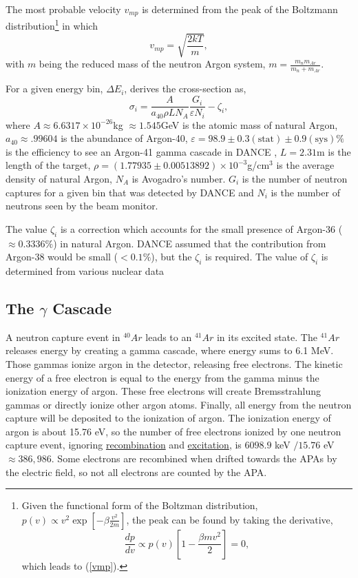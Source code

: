 \documentclass[8pt]{refart}
\begin{document}
The most probable velocity $v_{mp}$ is determined from the peak of the Boltzmann distribution\footnote{Given the functional form of the Boltzman distribution, $p(v) \propto v^2 \exp\left[-\beta \frac{v^2}{2m}\right]$, the peak can be found by taking the derivative,
\begin{equation}
\frac{dp}{dv} \propto p(v)\left[1 - \frac{\beta m v^2}{2}\right] = 0,
\end{equation}
which leads to (\ref{vmp}).} in which
\begin{equation}
    v_{mp} = \sqrt{\frac{2kT}{m}},\label{vmp}
\end{equation}
with $m$ being the reduced mass of the neutron Argon system, $m = \frac{m_n m_{Ar}}{m_n + m_{Ar}}$.

For a given energy bin, $\Delta E_i$, \cite{DANCE} derives the cross-section as,
\begin{equation}
    \sigma_i = \frac{A}{a_{40}\rho LN_A}\frac{G_i}{\varepsilon N_i} - \zeta_i,
\end{equation}
where $A \approx 6.6317\times 10^{-26}$kg $\approx 1.545$GeV is the atomic mass of natural Argon, $a_{40} \approx .99604$ is the abundance of Argon-40, $\varepsilon = 98.9 \pm 0.3(\mathrm{stat}) \pm 0.9(\mathrm{sys})\%$ is the efficiency to see an Argon-41 gamma cascade in DANCE \cite{DANCE}, $L = 2.31$m is the length of the target, $\rho = (1.77935 \pm 0.00513892)\times 10^{-3}$g/cm$^3$ is the average density of natural Argon, $N_A$ is Avogadro's number.  $G_i$ is the number of neutron captures for a given bin that was detected by DANCE \cite{DANCE} and $N_i$ is the number of neutrons seen by the beam monitor.  

The value $\zeta_i$ is a correction which accounts for the small presence of Argon-36 ($\approx 0.3336\%$) in natural Argon.  DANCE assumed that the contribution from Argon-38 would be small ($<0.1\%$), but the $\zeta_i$ is required.  The value of $\zeta_i$ is determined from various nuclear data 

\subsection{The $\gamma$ Cascade}
A neutron capture event in $^{40}Ar$ leads to an $^{41}Ar$ in its excited state. The $^{41}Ar$ releases energy by creating a gamma cascade, where energy sums to 6.1 MeV. Those gammas ionize argon in the detector, releasing free electrons. The kinetic energy of a free electron is equal to the energy from the gamma minus the ionization energy of argon. These free electrons will create Bremsstrahlung gammas or directly ionize other argon atoms. Finally, all energy from the neutron capture will be deposited to the ionization of argon. The ionization energy of argon is about 15.76 eV, so the number of free electrons ionized by one neutron capture event, ignoring \hyperref[recombination]{recombination} and \hyperref[excitation]{excitation}, is $6098.9$ keV $/ 15.76$ eV $\approx 386,986$.  Some electrons are recombined when drifted towards the APAs by the electric field, so not all electrons are counted by the APA.
\end{document}
